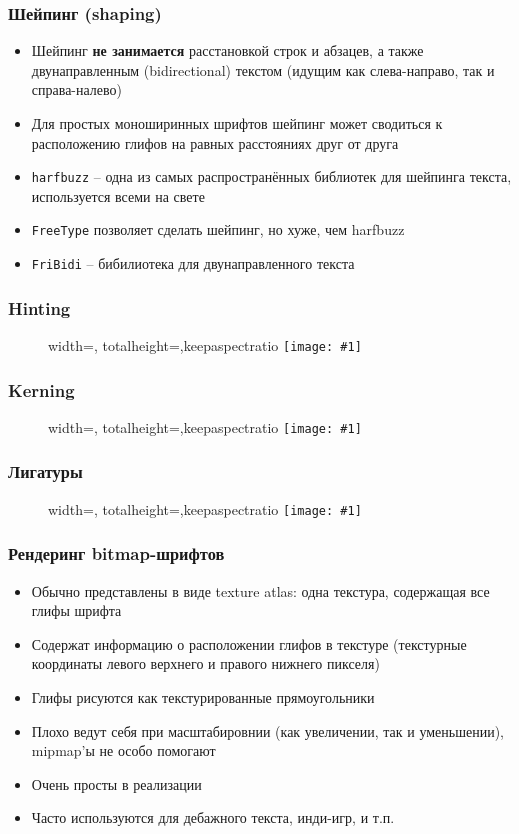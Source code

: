 \documentclass{beamer}
\newcommand{\slideimage}[1]{
  \begin{figure}
    \begin{adjustbox}{width=\textwidth, totalheight=\textheight-2\baselineskip-2\baselineskip,keepaspectratio}
      \texttt{[image: \#1]}
    \end{adjustbox}
  \end{figure}
}
\begin{document}
\begin{frame}[fragile]
\frametitle{Шейпинг (shaping)}
\begin{itemize}
\item Шейпинг \alert{\textbf{не занимается}} расстановкой строк и абзацев, а также двунаправленным (bidirectional) текстом (идущим как слева-направо, так и справа-налево)
\pause
\item Для простых моноширинных шрифтов шейпинг может сводиться к расположению глифов на равных расстояниях друг от друга
\pause
\item \verb|harfbuzz| -- одна из самых распространённых библиотек для шейпинга текста, используется всеми на свете
\pause
\item \verb|FreeType| позволяет сделать шейпинг, но хуже, чем harfbuzz
\pause
\item \verb|FriBidi| -- бибилиотека для двунаправленного текста
\end{itemize}
\end{frame}

\begin{frame}[fragile]
\frametitle{Hinting}
\slideimage{hinting.png}
\end{frame}

\begin{frame}[fragile]
\frametitle{Kerning}
\slideimage{kerning.png}
\end{frame}

\begin{frame}[fragile]
\frametitle{Лигатуры}
\slideimage{ligatures.png}
\end{frame}

\begin{frame}[fragile]
\frametitle{Рендеринг bitmap-шрифтов}
\begin{itemize}
\item Обычно представлены в виде texture atlas: одна текстура, содержащая все глифы шрифта
\pause
\item Содержат информацию о расположении глифов в текстуре (текстурные координаты левого верхнего и правого нижнего пикселя)
\pause
\item Глифы рисуются как текстурированные прямоугольники
\pause
\item Плохо ведут себя при масштабировнии (как увеличении, так и уменьшении), mipmap'ы не особо помогают
\pause
\item Очень просты в реализации
\pause
\item Часто используются для дебажного текста, инди-игр, и т.п.
\end{itemize}
\end{frame}
\end{document}
